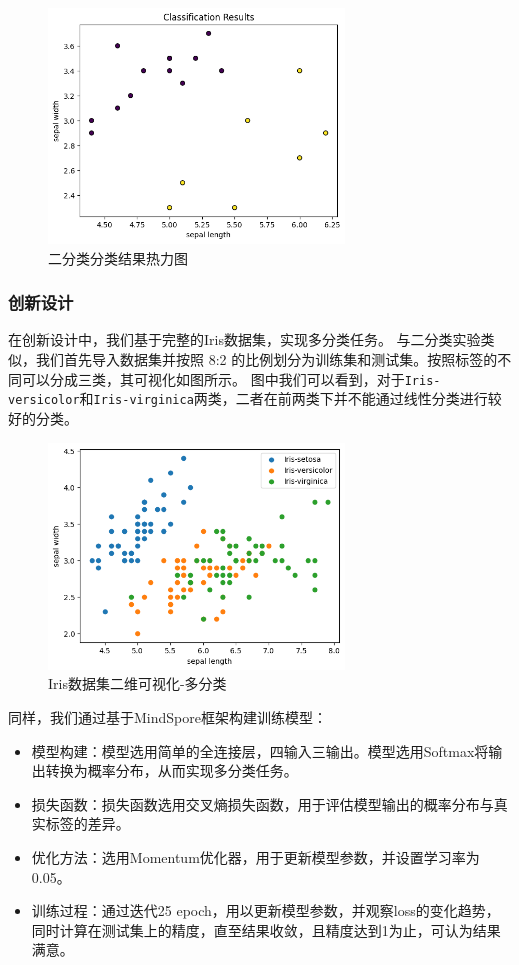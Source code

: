 \documentclass[12pt]{ctexart}
\begin{document}
\begin{figure}[H]
    \centering
    \includegraphics[width=0.7\textwidth]{image/output6-1.png}
    \caption{二分类分类结果热力图}
\end{figure}

\subsubsection*{创新设计}

在创新设计中，我们基于完整的Iris数据集，实现多分类任务。
与二分类实验类似，我们首先导入数据集并按照 8:2 的比例划分为训练集和测试集。按照标签的不同可以分成三类，其可视化如图所示。
图中我们可以看到，对于\texttt{Iris-versicolor}和\texttt{Iris-virginica}两类，二者在前两类下并不能通过线性分类进行较好的分类。

\begin{figure}[H]
    \centering
    \includegraphics[width=0.7\textwidth]{image/output7.png}
    \caption{Iris数据集二维可视化-多分类}
\end{figure}

同样，我们通过基于MindSpore框架构建训练模型：
\begin{itemize}
    \item 模型构建：模型选用简单的全连接层，四输入三输出。模型选用Softmax将输出转换为概率分布，从而实现多分类任务。
    \item 损失函数：损失函数选用交叉熵损失函数，用于评估模型输出的概率分布与真实标签的差异。
    \item 优化方法：选用Momentum优化器，用于更新模型参数，并设置学习率为0.05。
    \item 训练过程：通过迭代25 epoch，用以更新模型参数，并观察loss的变化趋势，同时计算在测试集上的精度，直至结果收敛，且精度达到1为止，可认为结果满意。
\end{itemize}
\end{document}
